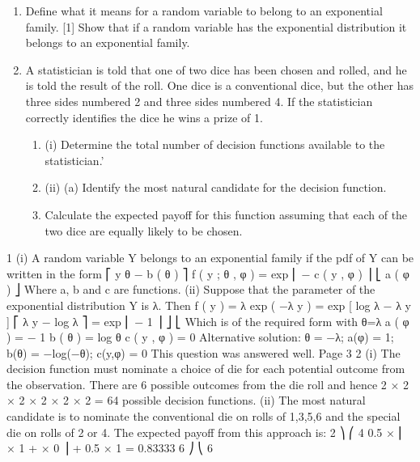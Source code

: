 \documentclass[a4paper,12pt]{article}
\begin{document}
\begin{enumerate}
\item 
Define what it means for a random variable to belong to an exponential
family.
[1]
Show that if a random variable has the exponential distribution it belongs to an
exponential family.

\item 
A statistician is told that one of two dice has been chosen and rolled, and he is told the result of the roll. One dice is a conventional dice, but the other has three sides numbered 2 and three sides numbered 4. If the statistician correctly identifies the dice he wins a prize of 1.
\begin{enumerate}
\item (i) Determine the total number of decision functions available to the statistician.'
\item 
(ii) (a)
Identify the most natural candidate for the decision function.
\item 
Calculate the expected payoff for this function assuming that each of
the two dice are equally likely to be chosen.
\end{enumerate}
\end{enumerate}
\newpage

1
(i)
A random variable Y belongs to an exponential family if the pdf of Y can be
written in the form
⎡ y θ − b ( θ )
⎤
f ( y ; θ , φ ) = exp ⎢
− c ( y , φ ) ⎥
⎣ a ( φ )
⎦
Where a, b and c are functions.
(ii)
Suppose that the parameter of the exponential distribution Y is λ. Then
f ( y ) = λ exp ( −λ y )
= exp [ log λ − λ y ]
⎡ λ y − log λ ⎤
= exp ⎢
− 1 ⎥ ⎦
⎣
Which is of the required form with
θ=λ
a ( φ ) = − 1
b ( θ ) = log θ
c ( y , φ ) = 0
Alternative solution: θ = −λ; a(φ) = 1; b(θ) = −log(−θ); c(y,φ) = 0
This question was answered well.
Page 3
2
(i)
The decision function must nominate a choice of die for each potential
outcome from the observation.
There are 6 possible outcomes from the die roll and hence 2 × 2 × 2 × 2 × 2 ×
2 = 64 possible decision functions.
(ii)
The most natural candidate is to nominate the conventional die on rolls of
1,3,5,6 and the special die on rolls of 2 or 4.
The expected payoff from this approach is:
2 ⎞
⎛ 4
0.5 × ⎜ × 1 + × 0 ⎟ + 0.5 × 1 = 0.83333
6 ⎠
⎝ 6

\end{document}
